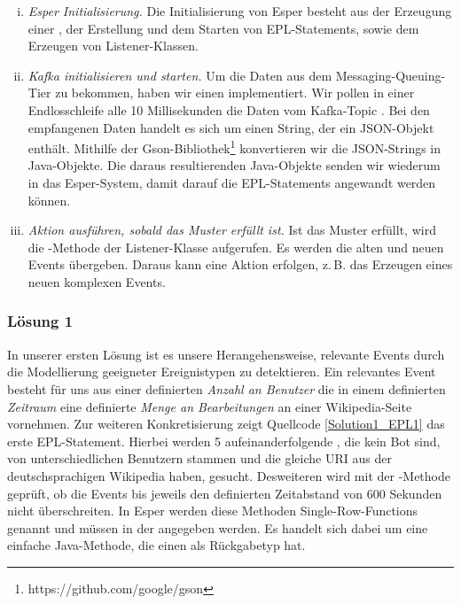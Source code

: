 \begin{enumerate}[i.]
    \item \textit{Esper Initialisierung.} Die Initialisierung von Esper besteht aus der Erzeugung einer ,
    der Erstellung und dem Starten von EPL-Statements, sowie dem Erzeugen von Listener-Klassen.
    \item \textit{Kafka initialisieren und starten.} Um die Daten aus dem Messaging-Queuing-Tier zu bekommen, haben wir einen
     implementiert.
    Wir pollen in einer Endlosschleife alle 10 Millisekunden die Daten vom Kafka-Topic . Bei den empfangenen Daten
    handelt es sich um einen String, der ein JSON-Objekt enthält. Mithilfe der Gson-Bibliothek\footnote{https://github.com/google/gson}
    konvertieren wir die JSON-Strings in Java-Objekte. Die daraus resultierenden Java-Objekte senden wir wiederum in das
    Esper-System, damit darauf die EPL-Statements angewandt werden können.
    \item \textit{Aktion ausführen, sobald das Muster erfüllt ist.} Ist das Muster erfüllt, wird die -Methode der Listener-Klasse
    aufgerufen. Es werden die alten und neuen Events übergeben. Daraus kann eine Aktion erfolgen, z.\,B. das Erzeugen eines neuen
    komplexen Events.
\end{enumerate}


\subsubsection{Lösung 1}
In unserer ersten Lösung ist es unsere Herangehensweise, relevante Events durch die Modellierung geeigneter Ereignistypen zu detektieren.
Ein relevantes Event besteht für uns aus einer definierten \textit{Anzahl an Benutzer} die in einem
definierten \textit{Zeitraum} eine definierte \textit{Menge an Bearbeitungen} an einer Wikipedia-Seite vornehmen.
Zur weiteren Konkretisierung zeigt Quellcode \ref{Solution1_EPL1} das erste EPL-Statement. Hierbei werden
5 aufeinanderfolgende , die kein Bot sind, von unterschiedlichen Benutzern stammen
und die gleiche URI aus der deutschsprachigen Wikipedia haben, gesucht. Desweiteren wird mit der -Methode
geprüft, ob die Events  bis  jeweils den definierten Zeitabstand von 600 Sekunden nicht überschreiten.
In Esper werden diese Methoden Single-Row-Functions genannt und müssen in der  angegeben werden.
Es handelt sich dabei um eine einfache Java-Methode, die einen  als Rückgabetyp hat.

